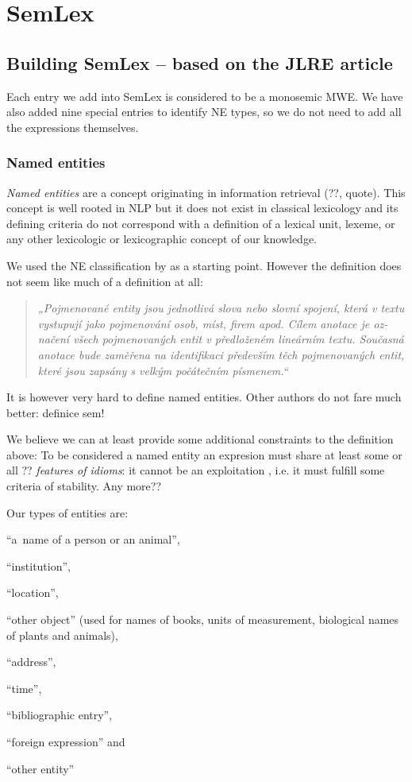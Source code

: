 
\chapter{SemLex}
\label{sec:semlex}

\section{Building SemLex – based on the JLRE article}
\label{sec:semlex:build}
Each entry we add into SemLex is considered to be a monosemic MWE. 
We have also added nine special entries to identify NE types, so we do not need to add all the expressions themselves.

\subsection{Named entities}
\emph{Named entities} are a concept originating in information retrieval (??, quote). This concept is well rooted in NLP but it does not exist in classical lexicology and its defining criteria do not correspond with a definition of a lexical unit, lexeme, or any other lexicologic or lexicographic concept of our knowledge.

We used the NE classification by \citet{sevcikova:2007} as a starting point. However the definition does not seem like much of a definition at all:
\begin{quote}
\textczech{\em „Pojmenované entity jsou jednotlivá slova nebo slovní spojení, která v textu vystupují jako
pojmenování osob, míst, firem apod. Cílem anotace je označení všech pojmenovaných entit v 
předloženém lineárním textu. Současná anotace bude zaměřena na identifikaci
především těch pojmenovaných entit, které jsou zapsány s velkým počátečním písmenem.“}
\end{quote}

It is however very hard to define named entities. Other authors do not fare much better: {\xxx definice sem!}

We believe we can at least provide some additional constraints to the definition above: To be considered a named entity an expresion must share at least some {\xxx or all ??} \emph{features of idioms}: it cannot be an exploitation \citep[see]{hanks:norms}, i.e. it must fulfill some criteria of stability. {\xxx Any more??}

Our types of entities are:
\begin{compactenum}
\item ``a~name of a person or an animal'', 
\item``institution'', 
\item``location'', 
\item``other object'' (used for names of books, units of measurement, biological names of plants and animals), 
\item``address'', 
\item``time'', 
\item``bibliographic entry'', 
\item``foreign expression'' and 
\item``other entity''
\end{compactenum}

